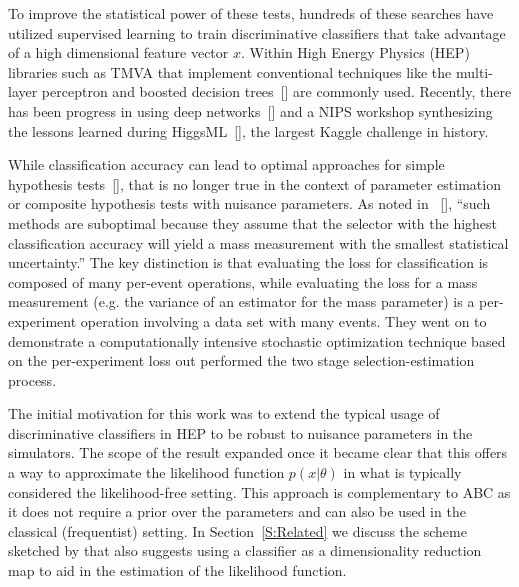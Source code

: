 \documentclass[aoas,preprint]{imsart}
\newcommand{\citek}[1]{[\cite{#1}]}
\numberwithin{equation}{section}
\theoremstyle{plain}
\begin{document}
To improve the statistical power of these tests, hundreds of these searches have utilized supervised learning to train discriminative classifiers that take advantage of a high dimensional feature vector $x$. Within High Energy Physics (HEP) libraries such as TMVA that implement conventional techniques like the multi-layer perceptron and boosted decision trees~\citek{Hocker:2007ht} are commonly used. Recently, there has been progress in using deep networks~\citek{Baldi:2014kfa} and a NIPS workshop synthesizing the lessons learned during HiggsML~\citek{HepML}, the largest Kaggle challenge in history. 

While classification accuracy can lead to optimal approaches for simple hypothesis tests~\citek{Dempster1965}, that is no longer true in the context of parameter estimation or composite hypothesis tests with nuisance parameters. As noted in ~\citek{Whiteson:2006ws}, ``such methods are suboptimal because they assume that the selector with the highest classification accuracy will yield a mass measurement with the smallest statistical uncertainty.''
The key distinction is that evaluating the loss for classification is composed of many per-event operations, while evaluating the loss for a mass measurement (e.g. the variance of an estimator for the mass parameter) is a per-experiment operation involving a data set with many events. They went on to demonstrate a computationally intensive stochastic optimization technique based on the per-experiment loss out performed the two stage selection-estimation process. 

The initial motivation for this work was to extend the typical usage of discriminative classifiers in HEP to be robust to 
nuisance parameters in the simulators. The scope of the result expanded once it became clear that this offers a way to approximate the likelihood function $p(x|\theta)$ in what is typically considered the likelihood-free setting. This approach is complementary to ABC as it does not require a prior over the parameters and can also be used in the classical (frequentist) setting.  In Section~\ref{S:Related} we discuss the scheme sketched by \cite{Neal:2007zz} that also suggests using a classifier  as a dimensionality reduction map to aid in the estimation of the likelihood function.
\end{document}
